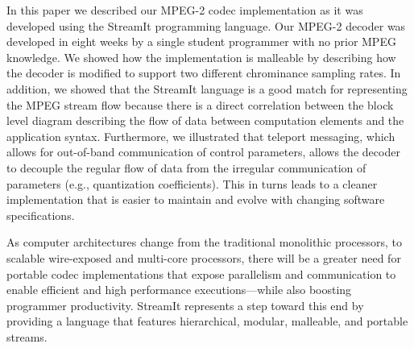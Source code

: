 \vspace{-2pt}
\vspace{-7pt}

In this paper we described our MPEG-2 codec implementation as it was
developed using the StreamIt programming language. Our MPEG-2 decoder
was developed in eight weeks by a single student programmer with no
prior MPEG knowledge. We showed how the implementation is malleable by
describing how the decoder is modified to support two different chrominance
sampling rates. In addition, we showed that the StreamIt language is a
good match for representing the MPEG stream flow because there is a
direct correlation between the block level diagram describing the flow of
data between computation elements and the application
syntax. Furthermore, we illustrated that teleport messaging, which
allows for out-of-band communication of control parameters, allows the
decoder to decouple the regular flow of data from the irregular
communication of parameters (e.g., quantization
coefficients). This in turns leads to a cleaner implementation that is
easier to maintain and evolve with changing software specifications.

As computer architectures change from the traditional monolithic
processors, to scalable wire-exposed and multi-core processors, there
will be a greater need for portable codec implementations that expose
parallelism and communication to enable efficient and high performance
executions---while also boosting programmer productivity.  StreamIt
represents a step toward this end by providing a language that
features hierarchical, modular, malleable, and portable streams.
